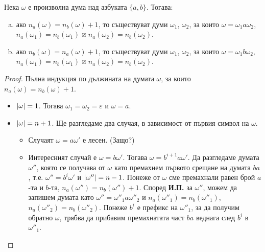 \begin{problem}
  \label{pr:nanb}
  Нека $\omega$ е произволна дума над азбуката $\{a,b\}$. 
  Тогава:
  \begin{enumerate}[a)]
  \item 
    ако $n_a(\omega) = n_b(\omega) + 1$, то съществуват думи $\omega_1$, $\omega_2$, за които
    $\omega = \omega_1 a \omega_2$, $n_a(\omega_1) = n_b(\omega_1)$ и $n_a(\omega_2) = n_b(\omega_2)$.
  \item
    ако $n_b(\omega) = n_a(\omega) + 1$, то съществуват думи $\omega_1$, $\omega_2$, за които
    $\omega = \omega_1 b \omega_2$, $n_a(\omega_1) = n_b(\omega_1)$ и $n_a(\omega_2) = n_b(\omega_2)$.
  \end{enumerate}
\end{problem}
\begin{proof}
  Пълна индукция по дължината на думата $\omega$, за които $n_a(\omega) = n_b(\omega)+1$.
  \begin{itemize}
  \item 
    $\lvert{\omega}\rvert = 1$. Тогава $\omega_1 = \omega_2 = \varepsilon$ и $\omega = a$.
  \item
    $\lvert{\omega}\rvert = n+1$. Ще разгледаме два случая, в зависимост от първия символ на $\omega$.
    \begin{itemize}
    \item 
      Случаят $\omega = a\omega'$ е лесен. (Защо?)
    \item
      Интересният случай е $\omega = b\omega'$.    
      Тогава $\omega = b^{i+1}a\omega'$. Да разгледаме думата $\omega''$, която се получава от $\omega$
      като премахнем първото срещане на думата $ba$, т.е. 
      $\omega'' = b^i\omega'$ и $\lvert{\omega''}\rvert = n-1$.
      Понеже от $\omega$ сме премахнали равен брой $a$-та и $b$-та, $n_a(\omega'') = n_b(\omega'')+1$.
      Според {\bf И.П.} за $\omega''$, можем да запишем думата като $\omega'' = \omega''_1a\omega''_2$
      и $n_a(\omega''_1) = n_b(\omega''_1)$, $n_a(\omega''_2) = n_b(\omega''_2)$.
      Понеже $b^i$ е префикс на $\omega''_1$, за да получим обратно $\omega$, трябва 
      да прибавим премахнатата част $ba$ веднага след $b^i$ в $\omega''_1$.
    \end{itemize}
  \end{itemize}
\end{proof}

